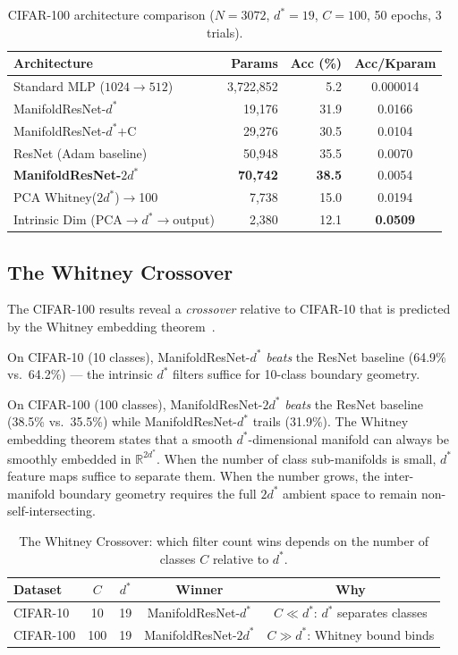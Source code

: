 \documentclass[11pt,letterpaper]{article}
\begin{document}
\begin{table}[h]
\centering
\caption{CIFAR-100 architecture comparison ($N=3072$, $d^*=19$, $C=100$,
  50 epochs, 3 trials).}
\label{tab:cifar100_arch}
\begin{tabular}{@{}lrrc@{}}
\toprule
\textbf{Architecture} & \textbf{Params} & \textbf{Acc (\%)} & \textbf{Acc/Kparam} \\
\midrule
Standard MLP ($1024\to512$) & 3{,}722{,}852 & 5.2 & 0.000014 \\
ManifoldResNet-$d^*$ & 19{,}176 & 31.9 & 0.0166 \\
ManifoldResNet-$d^*$$+$C & 29{,}276 & 30.5 & 0.0104 \\
ResNet (Adam baseline) & 50{,}948 & 35.5 & 0.0070 \\
\textbf{ManifoldResNet-}$2d^*$ & \textbf{70{,}742} & \textbf{38.5} & 0.0054 \\
PCA Whitney($2d^*$)$\to$100 & 7{,}738 & 15.0 & 0.0194 \\
Intrinsic Dim (PCA$\to d^*\to$output) & 2{,}380 & 12.1 & \textbf{0.0509} \\
\bottomrule
\end{tabular}
\end{table}

\subsection{The Whitney Crossover}

The CIFAR-100 results reveal a \emph{crossover} relative to CIFAR-10 that
is predicted by the Whitney embedding theorem~\cite{whitney1944}.

On CIFAR-10 (10 classes), ManifoldResNet-$d^*$ \emph{beats} the ResNet
baseline (64.9\% vs.\ 64.2\%) — the intrinsic $d^*$ filters suffice for
10-class boundary geometry.

On CIFAR-100 (100 classes), ManifoldResNet-$2d^*$ \emph{beats} the
ResNet baseline (38.5\% vs.\ 35.5\%) while ManifoldResNet-$d^*$ trails
(31.9\%).  The Whitney embedding theorem states that a smooth
$d^*$-dimensional manifold can always be smoothly embedded in
$\mathbb{R}^{2d^*}$.  When the number of class sub-manifolds is small,
$d^*$ feature maps suffice to separate them.  When the number grows, the
inter-manifold boundary geometry requires the full $2d^*$ ambient space
to remain non-self-intersecting.

\begin{table}[h]
\centering
\caption{The Whitney Crossover: which filter count wins depends on
  the number of classes $C$ relative to $d^*$.}
\label{tab:crossover}
\begin{tabular}{@{}lcccc@{}}
\toprule
\textbf{Dataset} & $C$ & $d^*$ & \textbf{Winner} & \textbf{Why} \\
\midrule
CIFAR-10  & 10  & 19 & ManifoldResNet-$d^*$   & $C \ll d^*$: $d^*$ separates classes \\
CIFAR-100 & 100 & 19 & ManifoldResNet-$2d^*$  & $C \gg d^*$: Whitney bound binds \\
\bottomrule
\end{tabular}
\end{table}
\end{document}
